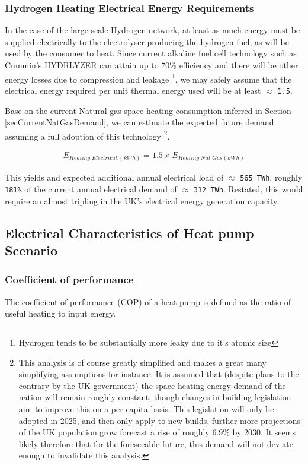 \documentclass[11pt]{article}
\numberwithin{equation}{section}
\begin{document}
\subsubsection{Hydrogen Heating Electrical Energy Requirements}
\label{sec:org613104b}
In the case of the large scale Hydrogen network, at least as much energy must be supplied electrically to the electrolyser producing the hydrogen fuel, as will be used by the consumer to heat. Since current alkaline fuel cell technology such as Cummin's HYDRLYZER can attain up to 70\% efficiency \cite{CuminsElectrolizer} and there will be other energy losses due to compression and leakage \footnote{Hydrogen tends to be substantially more leaky due to it's atomic size}, we may safely assume that the electrical energy required per unit thermal energy used will be at least \(\approx\) \texttt{1.5}.

Base on the current Natural gas space heating consumption inferred in Section \ref{secCurrentNatGasDemand}, we can estimate the expected future demand assuming a full adoption of this technology \footnote{This analysis is of course greatly simplified and makes a great many simplifying assumptions for instance: It is assumed that (despite plans to the contrary by the UK government) the space heating energy demand of the nation will remain roughly constant, though changes in building legislation aim to improve this on a per capita basis. This legislation will only be adopted in 2025, and then only apply to new builds, further more projections of the UK population grow forecast a rise of roughly 6.9\% by 2030. It seems likely therefore that for the foreseeable future, this demand will not deviate enough to invalidate this analysis.}.

\begin{align}
\label{eqFutureSpcHeatingDemand}
E_{Heating\;Electrical\;(kWh)} = 1.5\times E_{Heating\;Nat\;Gas (kWh)}
\end{align}

This yields and expected additional annual electrical load of \(\approx\) \texttt{565 TWh}, roughly \texttt{181\%} of the current annual electrical demand of \(\approx\) \texttt{312 TWh}. Restated, this would require an almost tripling in the UK's electrical energy generation capacity.

\subsection{Electrical Characteristics of Heat pump Scenario}
\label{sec:orgb82b494}
\subsubsection{Coefficient of performance}
\label{sec:orgec950b2}
The coefficient of performance (COP) of a heat pump is defined as the ratio of useful heating to input energy.
\end{document}
